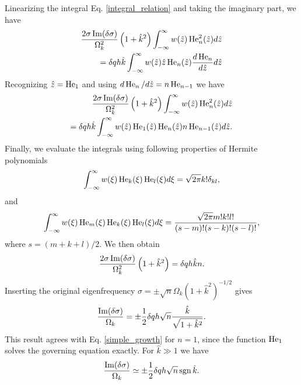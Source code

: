 Linearizing the integral Eq. \ref{integral_relation} and taking the
imaginary part, we have
\begin{align}
  \frac{2\sigma\operatorname{Im}(\delta\sigma)}{\Omega_k^2}
  \left(1+\hat{k}^2\right) \int_{-\infty}^{\infty} w(\hat{z})
  \operatorname{He}_n^2(\hat{z}) d\hat{z} \notag\\
  = \delta q h \hat{k} 
  \int_{-\infty}^{\infty}
  w(\hat{z})\hat{z}\operatorname{He}_n(\hat{z})\frac{d\operatorname{He}_n}{d\hat{z}} d\hat{z}
\end{align}
Recognizing $\hat{z} = \operatorname{He}_1$ and using $d\operatorname{He}_n/d\hat{z} = n
\operatorname{He}_{n-1}$ we have
 \begin{align}
   \frac{2\sigma\operatorname{Im}(\delta\sigma)}{\Omega_k^2}
   \left(1+\hat{k}^2\right) \int_{-\infty}^{\infty} w(\hat{z})
   \operatorname{He}_n^2(\hat{z}) d\hat{z} \notag\\
   =\delta q h \hat{k} 
   \int_{-\infty}^{\infty}
   w(\hat{z})\operatorname{He}_1(\hat{z})\operatorname{He}_n(\hat{z})n\operatorname{He}_{n-1}(\hat{z})d\hat{z}. 
 \end{align}
Finally, we evaluate the integrals using following properties of Hermite polynomials
\begin{align}
  \int_{-\infty}^{\infty}
  w(\xi) \operatorname{He}_k(\xi)\operatorname{He}_l(\xi) d\xi = \sqrt{2\pi}k!\delta_{kl}, 
\end{align}
and
\begin{align}
  \int_{-\infty}^{\infty}
  w(\xi) \operatorname{He}_m(\xi)\operatorname{He}_k(\xi)\operatorname{He}_l(\xi) d\xi =
  \frac{\sqrt{2\pi}m!k!l!}{(s-m)!(s-k)!(s-l)!}, 
\end{align}
where $s = (m+k+l)/2$. We then obtain
 \begin{align}
  \frac{2\sigma\operatorname{Im}(\delta\sigma)}{\Omega_k^2}
  \left(1+\hat{k}^2\right) = \delta q h \hat{k} n.
 \end{align}
Inserting the original eigenfrequency $\sigma = \pm
\sqrt{n}\Omega_k(1+\hat{k}^2)^{-1/2}$ gives
\begin{align}
  \frac{\operatorname{Im}(\delta\sigma)}{\Omega_k} = \pm \frac{1}{2}\delta q h
  \sqrt{n} \frac{\hat{k}}{\sqrt{1+\hat{k}^2}}. 
\end{align}
This result agrees with Eq. \ref{simple_growth} for $n=1$, since the
function $\operatorname{He}_1$ solves the governing equation exactly. For $\hat{k}\gg 1$ we have
\begin{align}
  \frac{\operatorname{Im}(\delta\sigma)}{\Omega_k} \simeq \pm \frac{1}{2}\delta q h
  \sqrt{n} \operatorname{sgn}{\hat{k}}. 
\end{align}